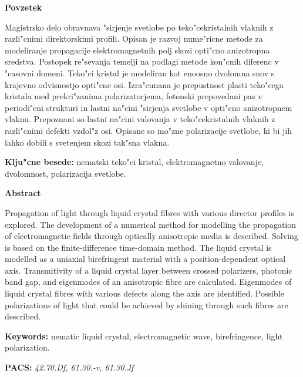 \documentclass[12pt,twoside,openright,final]{report}
\begin{document}
\newpage

\normalsize
\thispagestyle{plain}

\vfill
\centerline{\bf Povzetek}
\bigskip
\noindent

Magistrsko delo obravnava "sirjenje svetlobe po teko"cekristalnih vlaknih z razli"cnimi direktorskimi profili. 
Opisan je razvoj nume"ricne metode za modeliranje propagacije elektromagnetnih polj skozi opti"cno anizotropna sredstva. 
Postopek re"sevanja temelji na podlagi metode kon"cnih diferenc v "casovni domeni. 
Teko"ci kristal je modeliran kot enoosno dvolomna snov s krajevno odvisnostjo opti"cne osi.
Izra"cunana je prepustnost plasti teko"cega kristala med prekri"zanima polarizatorjema, fotonski prepovedani pas v periodi"cni strukturi in lastni na"cini "sirjenja svetlobe v opti"cno anizotropnem vlaknu. 
Prepoznani so lastni na"cini valovanja v teko"cekristalnih vlaknih z razli"cnimi defekti vzdol"z osi. 
Opisane so mo"zne polarizacije svetlobe, ki bi jih lahko dobili s svetenjem skozi tak"sna vlakna. 


\bigskip
\noindent
{\bf Klju"cne besede:} nematski teko"ci kristal, elektromagnetno valovanje, dvolomnost, polarizacija svetlobe.

\bigskip
\bigskip

\vfill
\centerline{\bf Abstract}
\bigskip
\noindent

Propagation of light through liquid crystal fibres with various director profiles is explored. 
The development of a numerical method for modelling the propagation of electromagnetic fields through optically anisotropic media is described. 
Solving is based on the finite-difference time-domain method. 
The liquid crystal is modelled as a uniaxial birefringent material with a position-dependent optical axis. 
Transmitivity of a liquid crystal layer between crossed polarizers, photonic band gap, and eigenmodes of an anisotropic fibre are calculated. 
Eigenmodes of liquid crystal fibres with various defects along the axis are identified. 
Possible polarizations of light that could be achieved by shining through such fibres are described. 

\bigskip
\noindent
{\bf Keywords:} nematic liquid crystal, electromagnetic wave, birefringence, light polarization.

\bigskip
\vfill

\noindent
{\bf PACS:} \textit{
42.70.Df, %
61.30.-v, %
61.30.Jf %
}
\end{document}
